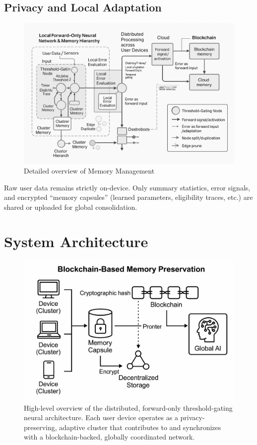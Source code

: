 \documentclass[11pt]{article}
\begin{document}
\subsection{Privacy and Local Adaptation}
    \begin{figure}
        \centering
        \includegraphics[width=0.5\linewidth]{architecture_diagrams/bbe6c593-355f-42f7-a0a1-79f3937b8efa.png}
        \caption{Detailed overview of Memory Management}
        \label{fig:overview-mem-management}
    \end{figure}
Raw user data remains strictly on-device. Only summary statistics, error signals, and encrypted “memory capsules” (learned parameters, eligibility traces, etc.) are shared or uploaded for global consolidation.

\section{System Architecture}

\begin{figure}[ht]
    \centering
    \includegraphics[width=0.76\linewidth]{architecture_diagrams/6f6cd4fd-81a1-4ae3-be8c-6fd34920efe3.png}
    \caption{
        High-level overview of the distributed, forward-only threshold-gating neural architecture. Each user device operates as a privacy-preserving, adaptive cluster that contributes to and synchronizes with a blockchain-backed, globally coordinated network.
    }
    \label{fig:high-level-architecture}
\end{figure}
\end{document}
